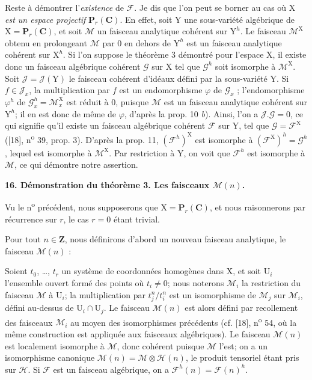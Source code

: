Reste à démontrer l'\textit{existence} de $\mathcal{F}$. Je dis que l'on peut se borner au cas où $\mathrm{X}$ \textit{est un espace projectif} $\mathbf{P}_r(\mathbf{C})$. En effet, soit $\mathrm{Y}$ une sous-variété algébrique de $\mathrm{X} = \mathbf{P}_r(\mathbf{C})$, et soit $\mathcal{M}$ un faisceau analytique cohérent sur $\mathrm{Y}^h$. Le faisceau $\mathcal{M}^{\mathrm{X}}$ obtenu en prolongeant $\mathcal{M}$ par 0 en dehors de $\mathrm{Y}^h$ est un faisceau analytique cohérent sur $\mathrm{X}^h$. Si l'on suppose le théorème 3 démontré pour l'espace $\mathrm{X}$, il existe donc un faisceau algébrique cohérent $\mathcal{G}$ sur $\mathrm{X}$ tel que $\mathcal{G}^h$ soit isomorphe à $\mathcal{M}^{\mathrm{X}}$. Soit $\mathcal{J} = \mathcal{J}(\mathrm{Y})$ le faisceau cohérent d'idéaux défini par la sous-variété $\mathrm{Y}$. Si $f \in \mathcal{J}_x$, la multiplication par $f$ est un endomorphisme $\varphi$ de $\mathcal{G}_x$ ; l'endomorphisme $\varphi^h$ de $\mathcal{G}^h_x = \mathcal{M}^{\mathrm{X}}_x$ est réduit à 0, puisque $\mathcal{M}$ est un faisceau %
analytique cohérent sur $\mathrm{Y}^h$; il en est donc de même de $\varphi$, d'après la prop. 10 \textit{b}). Ainsi, l'on a $\mathcal{J}.\mathcal{G} = 0$, ce qui signifie qu'il existe un faisceau algébrique cohérent $\mathcal{F}$ sur $\mathrm{Y}$, tel que $\mathcal{G} = \mathcal{F}^{\mathrm{X}}$ ([18], n\textsuperscript{o} 39, prop. 3). D'après la prop. 11, $(\mathcal{F}^h)^{\mathrm{X}}$ est isomorphe à $(\mathcal{F}^{\mathrm{X}})^h = \mathcal{G}^h$, lequel est isomorphe à $\mathcal{M}^{\mathrm{X}}$. Par restriction à $\mathrm{Y}$, on voit que $\mathcal{F}^h$ est isomorphe à $\mathcal{M}$, ce qui démontre notre assertion.


\textbf{16. Démonstration du théorème 3. Les faisceaux $\mathcal{M}(n)$.}

Vu le n\textsuperscript{o} précédent, nous supposerons que $\mathrm{X} = \mathbf{P}_r(\mathbf{C})$, et nous raisonnerons par récurrence sur $r$, le cas $r = 0$ étant trivial.

Pour tout $n \in \mathbf{Z}$, nous définirons d'abord un nouveau faisceau analytique, le faisceau $\mathcal{M}(n)$ :

Soient $t_0$, \ldots, $t_r$ un système de coordonnées homogènes dans $\mathrm{X}$, et soit $\mathrm{U}_i$ l'ensemble ouvert formé des points où $t_i \neq 0$; nous noterons $\mathcal{M}_i$ la restriction du faisceau $\mathcal{M}$ à $\mathrm{U}_i$; la multiplication par $t_j^n/t_i^n$ est un isomorphisme de $\mathcal{M}_j$ sur $\mathcal{M}_i$, défini au-dessus de $\mathrm{U}_i \cap \mathrm{U}_j$. Le faisceau $\mathcal{M}(n)$ est alors défini par recollement des faisceaux $\mathcal{M}_i$ au moyen des isomorphismes précédents (cf. [18], n\textsuperscript{o} 54, où la même construction est appliquée aux faisceaux algébriques). Le faisceau $\mathcal{M}(n)$ est localement isomorphe à $\mathcal{M}$, donc cohérent puisque $\mathcal{M}$ l'est; on a un isomorphisme canonique $\mathcal{M}(n) = \mathcal{M} \otimes \mathcal{H}(n)$, le produit tensoriel étant pris sur $\mathcal{H}$. Si $\mathcal{F}$ est un faisceau algébrique, on a $\mathcal{F}^h(n) = \mathcal{F}(n)^h$.

